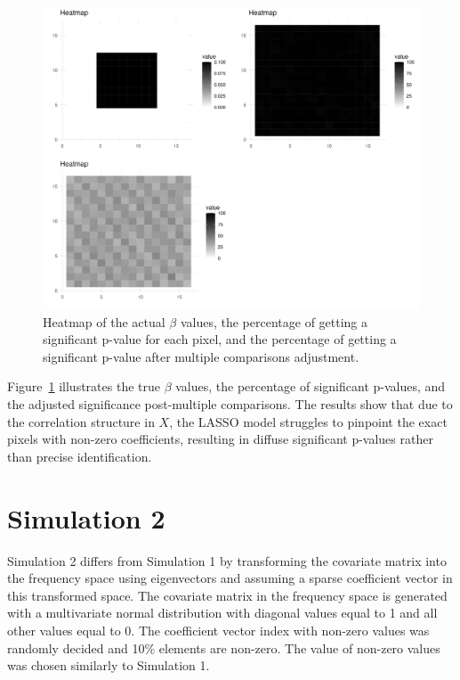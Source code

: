 \documentclass[12pt]{article}
\begin{document}
\begin{figure}[H]
    \centering
    \includegraphics[width=\textwidth]{../Figures/sim1_heatmap.png}
    \caption{Heatmap of the actual \(\beta\) values, the percentage of getting a significant p-value for each pixel, and the percentage of getting a significant p-value after multiple comparisons adjustment.}
    \label{fig:sim1_heatmap}
\end{figure}

Figure~\ref{fig:sim1_heatmap} illustrates the true \(\beta\) values, the percentage of significant p-values, and the adjusted significance post-multiple comparisons. The results show that due to the correlation structure in \( X \), the LASSO model struggles to pinpoint the exact pixels with non-zero coefficients, resulting in diffuse significant p-values rather than precise identification.


\section*{Simulation 2}

Simulation 2 differs from Simulation 1 by transforming the covariate matrix into the frequency space using eigenvectors and assuming a sparse coefficient vector in this transformed space. The covariate matrix in the frequency space is generated with a multivariate normal distribution with diagonal values equal to 1 and all other values equal to 0. The coefficient vector index with non-zero values was randomly decided and 10\% elements are non-zero. The value of non-zero values was chosen similarly to Simulation 1.
\end{document}
